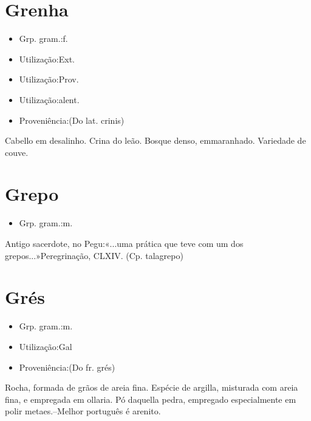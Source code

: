 \section{Grenha}
\begin{itemize}
\item {Grp. gram.:f.}
\end{itemize}
\begin{itemize}
\item {Utilização:Ext.}
\end{itemize}
\begin{itemize}
\item {Utilização:Prov.}
\end{itemize}
\begin{itemize}
\item {Utilização:alent.}
\end{itemize}
\begin{itemize}
\item {Proveniência:(Do lat. \textunderscore crinis\textunderscore )}
\end{itemize}
Cabello em desalinho.
Crina do leão.
Bosque denso, emmaranhado.
Variedade de couve.
\section{Grepo}
\begin{itemize}
\item {Grp. gram.:m.}
\end{itemize}
Antigo sacerdote, no Pegu:«\textunderscore ...uma prática que teve com um dos grepos...\textunderscore »\textunderscore Peregrinação\textunderscore , CLXIV.
(Cp. \textunderscore talagrepo\textunderscore )
\section{Grés}
\begin{itemize}
\item {Grp. gram.:m.}
\end{itemize}
\begin{itemize}
\item {Utilização:Gal}
\end{itemize}
\begin{itemize}
\item {Proveniência:(Do fr. \textunderscore grés\textunderscore )}
\end{itemize}
Rocha, formada de grãos de areia fina.
Espécie de argilla, misturada com areia fina, e empregada em ollaria.
Pó daquella pedra, empregado especialmente em polir metaes.--Melhor português é \textunderscore arenito\textunderscore .
